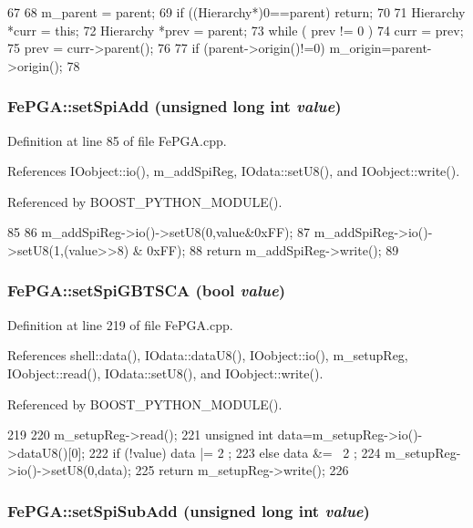 \begin{DoxyCode}
67                                               {
68   m_parent = parent;
69   if ((Hierarchy*)0==parent) return;
70 
71   Hierarchy *curr = this;
72   Hierarchy *prev = parent;
73   while ( prev != 0 ){
74     curr = prev;
75     prev = curr->parent();
76   }
77   if (parent->origin()!=0) m_origin=parent->origin();
78 }
\end{DoxyCode}
\hypertarget{classFePGA_a2cd235d1971625d6742d4f3107489a07}{
\subsubsection[{setSpiAdd}]{ FePGA::setSpiAdd (unsigned long int {\em value})}}
\label{classFePGA_a2cd235d1971625d6742d4f3107489a07}


Definition at line 85 of file FePGA.cpp.

References IOobject::io(), m\_\-addSpiReg, IOdata::setU8(), and IOobject::write().

Referenced by BOOST\_\-PYTHON\_\-MODULE().


\begin{DoxyCode}
85                                                     {
86   m_addSpiReg->io()->setU8(0,value&0xFF);
87   m_addSpiReg->io()->setU8(1,(value>>8) & 0xFF);
88   return m_addSpiReg->write();
89 }
\end{DoxyCode}
\hypertarget{classFePGA_a59b840619341df26918a6c26e8b8e72b}{
\subsubsection[{setSpiGBTSCA}]{ FePGA::setSpiGBTSCA (bool {\em value})}}
\label{classFePGA_a59b840619341df26918a6c26e8b8e72b}


Definition at line 219 of file FePGA.cpp.

References shell::data(), IOdata::dataU8(), IOobject::io(), m\_\-setupReg, IOobject::read(), IOdata::setU8(), and IOobject::write().

Referenced by BOOST\_\-PYTHON\_\-MODULE().


\begin{DoxyCode}
219                                           {
220   m_setupReg->read();
221   unsigned int data=m_setupReg->io()->dataU8()[0];
222   if (!value) data |=  2 ;
223   else        data &= ~2 ;
224   m_setupReg->io()->setU8(0,data);
225   return m_setupReg->write();
226 }
\end{DoxyCode}
\hypertarget{classFePGA_ad0a662adc6070427f0e1962c20a92de6}{
\subsubsection[{setSpiSubAdd}]{ FePGA::setSpiSubAdd (unsigned long int {\em value})}}
\label{classFePGA_ad0a662adc6070427f0e1962c20a92de6}


